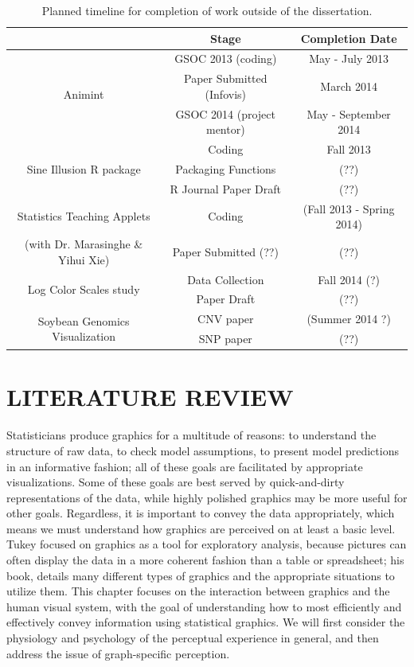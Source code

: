 \documentclass[11pt]{isuthesis}\usepackage[]{graphicx}\usepackage[]{color}
\begin{document}
\begin{table}[htbp]\centering
\begin{tabular}{|c|c|c|}\hline
 & Stage & Completion Date\\\hline
\multirow{3}{*}{Animint} & GSOC 2013 (coding) & May - July 2013\\
 & Paper Submitted (Infovis) & March 2014\\
 & GSOC 2014 (project mentor) & May - September 2014\\\hline
\multirow{3}{*}{Sine Illusion R package} & Coding & Fall 2013\\
 & Packaging Functions & (??)\\
 & R Journal Paper Draft & (??)\\\hline
Statistics Teaching Applets & Coding & (Fall 2013 - Spring 2014)\\
(with Dr. Marasinghe \& Yihui Xie) & Paper Submitted (??) & (??)\\\hline
\multirow{2}{*}{Log Color Scales study} & Data Collection & Fall 2014 (?) \\
 & Paper Draft & (??)\\\hline
\multirow{2}{*}{Soybean Genomics Visualization} & CNV paper & (Summer 2014 ?) \\
 & SNP paper & (??)\\\hline
\end{tabular}
\caption{Planned timeline for completion of work outside of the dissertation.}
\end{table}



\graphicspath{{Figure/LitReview/}{Images/LitReview/}}
\renewcommand{\floatpagefraction}{.99}



\chapter{LITERATURE REVIEW}\label{litreview}

Statisticians produce graphics for a multitude of reasons: to understand the structure of raw data, to check model assumptions, to present model predictions in an informative fashion; all of these goals are facilitated by appropriate visualizations. Some of these goals are best served by quick-and-dirty representations of the data, while highly polished graphics may be more useful for other goals. Regardless, it is important to convey the data appropriately, which means we must understand how graphics are perceived on at least a basic level. Tukey focused on graphics as a tool for exploratory analysis, because pictures can often display the data in a more coherent fashion than a table or spreadsheet; his book, \citet{eda} details many different types of graphics and the appropriate situations to utilize them. This chapter focuses on the interaction between graphics and the human visual system, with the goal of understanding how  to most efficiently and effectively convey information using statistical graphics. We will first consider the physiology and psychology of the perceptual experience in general, and then address the issue of graph-specific perception. 
\end{document}
